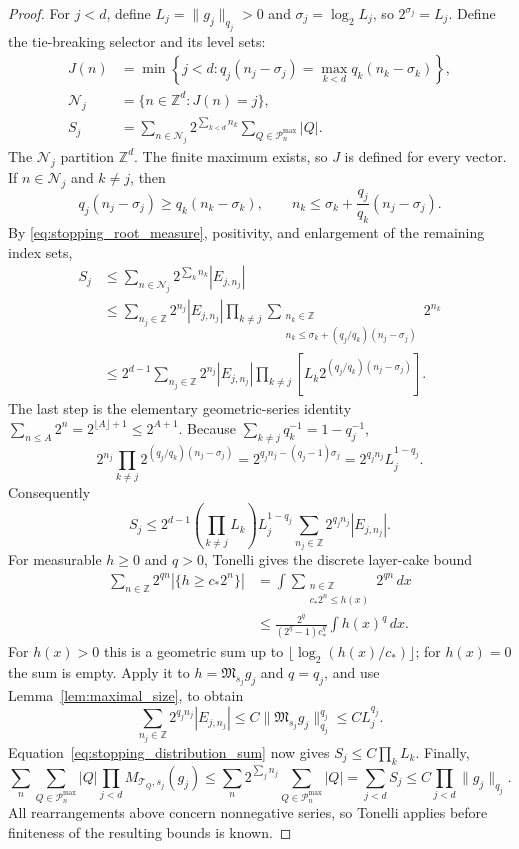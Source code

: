 \documentclass[12pt,reqno]{amsart}
\theoremstyle{plain}
\theoremstyle{definition}
\theoremstyle{remark}
\numberwithin{equation}{section}
\newcommand{\Z}{\mathbb Z}
\newcommand{\T}{\mathcal T}
\newcommand{\dd}{\,d}
\begin{document}
\begin{proof}
For $j<d$, define $L_j=\|g_j\|_{q_j}>0$ and
$\sigma_j=\log_2L_j$, so $2^{\sigma_j}=L_j$. Define the
tie-breaking selector and its level sets:
\begin{align*}
 J(n)&=\min\left\{j<d:q_j(n_j-\sigma_j)
                    =\max_{k<d}q_k(n_k-\sigma_k)\right\},\\
 \mathcal N_j&=\{n\in\Z^d:J(n)=j\},\\
 S_j&=\sum_{n\in\mathcal N_j}2^{\sum_{k<d}n_k}
                       \sum_{Q\in\mathcal P_n^{\max}}|Q|.
\end{align*}
The $\mathcal N_j$ partition $\Z^d$. The finite maximum exists,
so $J$ is defined for every vector. If $n\in\mathcal N_j$ and
$k\ne j$, then
\begin{equation}\label{eq:stopping_dominant}
 q_j(n_j-\sigma_j)\ge q_k(n_k-\sigma_k),\qquad
 n_k\le\sigma_k+\frac{q_j}{q_k}(n_j-\sigma_j).
\end{equation}
By \eqref{eq:stopping_root_measure}, positivity, and enlargement
of the remaining index sets,
\begin{align*}
 S_j
 &\le\sum_{n\in\mathcal N_j}2^{\sum_kn_k}|E_{j,n_j}|\\
 &\le\sum_{n_j\in\Z}2^{n_j}|E_{j,n_j}|
       \prod_{k\ne j}
       \sum_{\substack{n_k\in\Z\\
          n_k\le\sigma_k+(q_j/q_k)(n_j-\sigma_j)}}2^{n_k}\\
 &\le2^{d-1}\sum_{n_j\in\Z}2^{n_j}|E_{j,n_j}|
                 \prod_{k\ne j}
                 \left[L_k2^{(q_j/q_k)(n_j-\sigma_j)}\right].
\end{align*}
The last step is the elementary geometric-series identity
$\sum_{n\le A}2^n=2^{\lfloor A\rfloor+1}\le2^{A+1}$.
Because $\sum_{k\ne j}q_k^{-1}=1-q_j^{-1}$,
\[
 2^{n_j}\prod_{k\ne j}2^{(q_j/q_k)(n_j-\sigma_j)}
 =2^{q_jn_j-(q_j-1)\sigma_j}
 =2^{q_jn_j}L_j^{1-q_j}.
\]
Consequently
\begin{equation}\label{eq:stopping_distribution_sum}
 S_j\le2^{d-1}\left(\prod_{k\ne j}L_k\right)L_j^{1-q_j}
                 \sum_{n_j\in\Z}2^{q_jn_j}|E_{j,n_j}|.
\end{equation}
For measurable $h\ge0$ and $q>0$, Tonelli gives the discrete
layer-cake bound
\begin{align*}
 \sum_{n\in\Z}2^{qn}|\{h\ge c_*2^n\}|
 &=\int\sum_{\substack{n\in\Z\\c_*2^n\le h(x)}}2^{qn}\dd x\\
 &\le\frac{2^q}{(2^q-1)c_*^q}\int h(x)^q\dd x.
\end{align*}
For $h(x)>0$ this is a geometric sum up to
$\lfloor\log_2(h(x)/c_*)\rfloor$; for $h(x)=0$ the sum is empty.
Apply it to $h=\mathfrak M_{s_j}g_j$ and $q=q_j$, and use
Lemma~\ref{lem:maximal_size}, to obtain
\[
 \sum_{n_j\in\Z}2^{q_jn_j}|E_{j,n_j}|
 \le C\|\mathfrak M_{s_j}g_j\|_{q_j}^{q_j}
 \le C L_j^{q_j}.
\]
Equation~\eqref{eq:stopping_distribution_sum} now gives
$S_j\le C\prod_kL_k$. Finally,
\[
 \sum_n\sum_{Q\in\mathcal P_n^{\max}}|Q|
             \prod_{j<d}M_{\T_Q,s_j}(g_j)
 \le\sum_n2^{\sum_jn_j}\sum_{Q\in\mathcal P_n^{\max}}|Q|
 =\sum_{j<d}S_j\le C\prod_{j<d}\|g_j\|_{q_j}.
\]
All rearrangements above concern nonnegative series, so Tonelli
applies before finiteness of the resulting bounds is known.
\end{proof}
\end{document}
